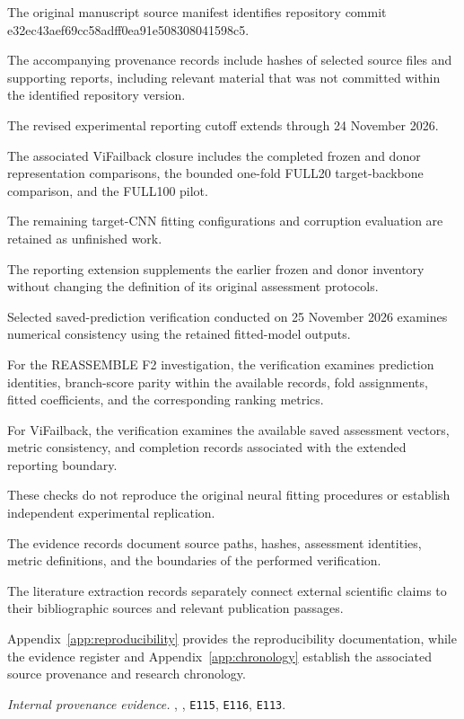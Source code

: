 The original manuscript source manifest identifies repository commit e32ec43aef69cc58adff0ea91e508308041598c5.

The accompanying provenance records include hashes of selected source files and supporting reports, including relevant material that was not committed within the identified repository version.

The revised experimental reporting cutoff extends through 24 November 2026.

The associated ViFailback closure includes the completed frozen and donor representation comparisons, the bounded one-fold FULL20 target-backbone comparison, and the FULL100 pilot.

The remaining target-CNN fitting configurations and corruption evaluation are retained as unfinished work.

The reporting extension supplements the earlier frozen and donor inventory without changing the definition of its original assessment protocols.

Selected saved-prediction verification conducted on 25 November 2026 examines numerical consistency using the retained fitted-model outputs.

For the REASSEMBLE F2 investigation, the verification examines prediction identities, branch-score parity within the available records, fold assignments, fitted coefficients, and the corresponding ranking metrics.

For ViFailback, the verification examines the available saved assessment vectors, metric consistency, and completion records associated with the extended reporting boundary.

These checks do not reproduce the original neural fitting procedures or establish independent experimental replication.

The evidence records document source paths, hashes, assessment identities, metric definitions, and the boundaries of the performed verification.

The literature extraction records separately connect external scientific claims to their bibliographic sources and relevant publication passages.

Appendix~\ref{app:reproducibility} provides the reproducibility documentation, while the evidence register and Appendix~\ref{app:chronology} establish the associated source provenance and research chronology.

\noindent\textit{Internal provenance evidence.} , , \texttt{E115}, \texttt{E116}, \texttt{E113}.

